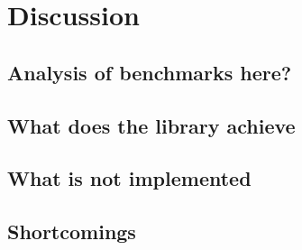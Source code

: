 
\chapter{Discussion}

\section{Analysis of benchmarks here?}
\section{What does the library achieve}
\section{What is not implemented}
\section{Shortcomings}

